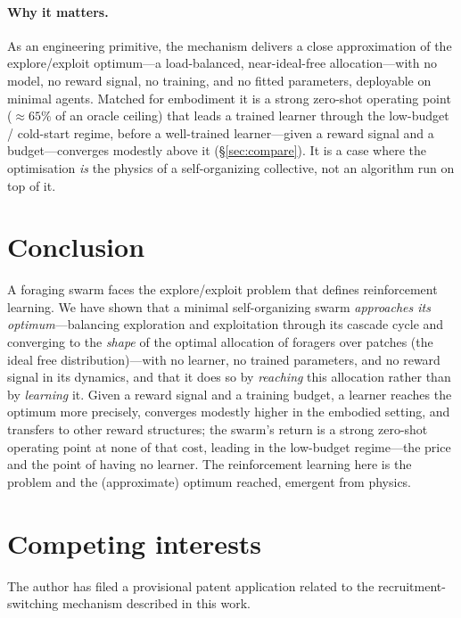 \documentclass{article}
\newif\ifanon
\begin{document}
\paragraph{Why it matters.} As an engineering primitive, the mechanism delivers a close approximation of the
explore/exploit optimum---a load-balanced, near-ideal-free allocation---with no model, no reward signal, no
training, and no fitted parameters, deployable on minimal agents. Matched for embodiment it is a strong
zero-shot operating point (${\approx}65\%$ of an oracle ceiling) that leads a trained learner through the
low-budget / cold-start regime, before a well-trained learner---given a reward signal and a budget---converges
modestly above it (\S\ref{sec:compare}). It is a case where the optimisation \emph{is} the physics of a
self-organizing collective, not an algorithm run on top of it.

\section{Conclusion}
A foraging swarm faces the explore/exploit problem that defines reinforcement learning. We have shown that a
minimal self-organizing swarm \emph{approaches its optimum}---balancing exploration and exploitation
through its cascade cycle and converging to the \emph{shape} of the optimal allocation of foragers over patches
(the ideal free distribution)---with no learner, no trained parameters, and no reward signal in its dynamics,
and that it does so by \emph{reaching} this allocation rather than by \emph{learning} it. Given a reward signal
and a training budget, a learner reaches the optimum more precisely, converges modestly higher in the embodied
setting, and transfers to other reward structures; the swarm's return is a strong zero-shot operating point at
none of that cost, leading in the low-budget regime---the price and the point of having no learner. The
reinforcement learning here is the problem and the (approximate) optimum reached, emergent from physics.

\section*{Competing interests}
\ifanon
Omitted for anonymized review; competing interests are declared in the submission metadata and will be stated
in the camera-ready version.
\else
The author has filed a provisional patent application related to the recruitment-switching mechanism described
in this work.
\fi
\end{document}
